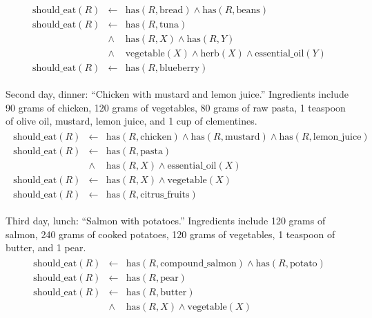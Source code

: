 \begin{prescriptions}
\begin{align*}
\begin{array}{rcl}
      \text{should\_eat}(R) &\leftarrow& \text{has}(R, \text{bread}) \land \text{has}(R, \text{beans}) \\
      \text{should\_eat}(R) &\leftarrow& \text{has}(R, \text{tuna}) \\
                            &\land& \text{has}(R, X) \land \text{has}(R, Y) \\
                            &\land& \text{vegetable}(X) \land \text{herb}(X) \land \text{essential\_oil}(Y) \\
      \text{should\_eat}(R) &\leftarrow& \text{has}(R, \text{blueberry})
    \end{array}
  \end{align*}
  \item Second day, dinner: ``Chicken with mustard and lemon juice.'' Ingredients include 90 grams of chicken, 120 grams of vegetables, 80 grams of raw pasta, 1 teaspoon of olive oil, mustard, lemon juice, and 1 cup of clementines.
  \begin{align*}
    \begin{array}{rcl}
      \text{should\_eat}(R) &\leftarrow& \text{has}(R, \text{chicken}) \land \text{has}(R, \text{mustard}) \land \text{has}(R, \text{lemon\_juice}) \\
      \text{should\_eat}(R) &\leftarrow& \text{has}(R, \text{pasta}) \\
                            &\land& \text{has}(R, X) \land \text{essential\_oil}(X) \\
      \text{should\_eat}(R) &\leftarrow& \text{has}(R, X) \land \text{vegetable}(X) \\
      \text{should\_eat}(R) &\leftarrow& \text{has}(R, \text{citrus\_fruits})
    \end{array}
  \end{align*}
  \item Third day, lunch: ``Salmon with potatoes.'' Ingredients include 120 grams of salmon, 240 grams of cooked potatoes, 120 grams of vegetables, 1 teaspoon of butter, and 1 pear.
  \begin{align*}
    \begin{array}{rcl}
      \text{should\_eat}(R) &\leftarrow& \text{has}(R, \text{compound\_salmon}) \land \text{has}(R, \text{potato}) \\
      \text{should\_eat}(R) &\leftarrow& \text{has}(R, \text{pear}) \\
      \text{should\_eat}(R) &\leftarrow& \text{has}(R, \text{butter}) \\
                            &\land& \text{has}(R, X) \land \text{vegetable}(X)

\end{array}
\end{align*}
\end{prescriptions}
